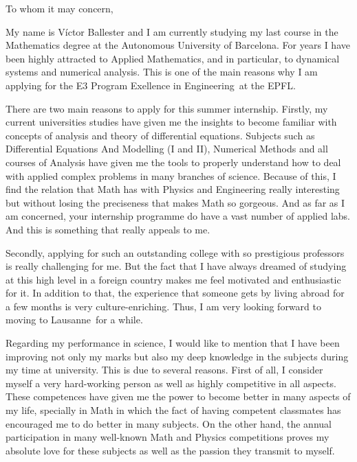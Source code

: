 \documentclass{letter}
\date{\today}
\newcommand{\intern}{E3 Program Exellence in Engineering}
\newcommand{\uni}{EPFL}
\newcommand{\city}{Lausanne}
\begin{document}
\begin{letter}
  \hfill

  \opening{To whom it may concern,} %
  \medskip

  My name is Víctor Ballester and I am currently studying my last course in the Mathematics degree at the Autonomous University of Barcelona. For years I have been highly attracted to Applied Mathematics, and in particular, to dynamical systems and numerical analysis. This is one of the main reasons why I am applying for the \intern\ at the \uni.

  There are two main reasons to apply for this summer internship. Firstly, my current universities studies have given me the insights to become familiar with concepts of analysis and theory of differential equations. Subjects such as Differential Equations And Modelling (I and II), Numerical Methods and all courses of Analysis have given me the tools to properly understand how to deal with applied complex problems in many branches of science. Because of this, I find the relation that Math has with Physics and Engineering really interesting but without losing the preciseness that makes Math so gorgeous. And as far as I am concerned, your internship programme do have a vast number of applied labs. And this is something that really appeals to me.

  Secondly, applying for such an outstanding college with so prestigious professors is really challenging for me. But the fact that I have always dreamed of studying at this high level in a foreign country makes me feel motivated and enthusiastic for it. In addition to that, the experience that someone gets by living abroad for a few months is very culture-enriching. Thus, I am very looking forward to moving to \city\ for a while.

  Regarding my performance in science, I would like to mention that I have been improving not only my marks but also my deep knowledge in the subjects during my time at university. This is due to several reasons. First of all, I consider myself a very hard-working person as well as highly competitive in all aspects. These competences have given me the power to become better in many aspects of my life, specially in Math in which the fact of having competent classmates has encouraged me to do better in many subjects. On the other hand, the annual participation in many well-known Math and Physics competitions proves my absolute love for these subjects as well as the passion they transmit to myself.


\end{letter}
\end{document}

